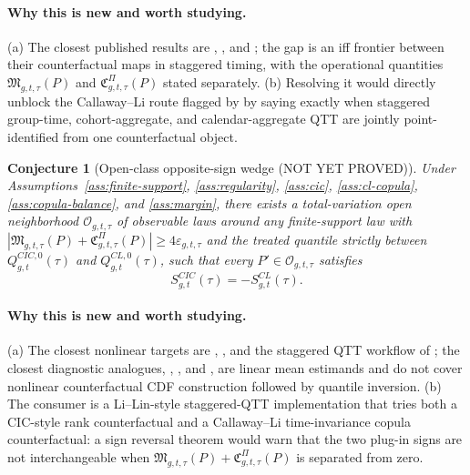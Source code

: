 \documentclass[11pt]{article}
\theoremstyle{definition}
\theoremstyle{plain}
\newtheorem{conjecture}{Conjecture}
\theoremstyle{remark}
\begin{document}
\paragraph{Why this is new and worth studying.}
(a) The closest published results are \citet[Sections 2--3, counterfactual CDF construction]{AtheyImbens2006}, \citet[Sections 2--3, time-invariance copula construction]{CallawayLi2019}, and \citet[abstract and concluding discussion on the staggered copula difficulty]{LiLin2024}; the gap is an iff frontier between their counterfactual maps in staggered timing, with the operational quantities \(\mathfrak M_{g,t,\tau}(P)\) and \(\mathfrak C^{\Pi}_{g,t,\tau}(P)\) stated separately. (b) Resolving it would directly unblock the Callaway--Li route flagged by \citet{LiLin2024} by saying exactly when staggered group-time, cohort-aggregate, and calendar-aggregate QTT are jointly point-identified from one counterfactual object.

\begin{conjecture}[Open-class opposite-sign wedge (NOT YET PROVED)]\label{conj:sign}
Under Assumptions~\ref{ass:finite-support}, \ref{ass:regularity}, \ref{ass:cic}, \ref{ass:cl-copula}, \ref{ass:copula-balance}, and \ref{ass:margin}, there exists a total-variation open neighborhood \(\mathcal O_{g,t,\tau}\) of observable laws around any finite-support law with \(|\mathfrak M_{g,t,\tau}(P)+\mathfrak C^{\Pi}_{g,t,\tau}(P)|\geq 4\varepsilon_{g,t,\tau}\) and the treated quantile strictly between \(Q^{CIC,0}_{g,t}(\tau)\) and \(Q^{CL,0}_{g,t}(\tau)\), such that every \(P'\in\mathcal O_{g,t,\tau}\) satisfies
\[
S^{CIC}_{g,t}(\tau)=-S^{CL}_{g,t}(\tau).
\]
\end{conjecture}
\paragraph{Why this is new and worth studying.}
(a) The closest nonlinear targets are \citet[Sections 2--3]{AtheyImbens2006}, \citet[Sections 2--3]{CallawayLi2019}, and the staggered QTT workflow of \citet[abstract and concluding discussion]{LiLin2024}; the closest diagnostic analogues, \citet{GoodmanBacon2021}, \citet{SunAbraham2021}, and \citet{deChaisemartinDHaultfoeuille2020}, are linear mean estimands and do not cover nonlinear counterfactual CDF construction followed by quantile inversion. (b) The consumer is a Li--Lin-style staggered-QTT implementation that tries both a CIC-style rank counterfactual and a Callaway--Li time-invariance copula counterfactual: a sign reversal theorem would warn that the two plug-in signs are not interchangeable when \(\mathfrak M_{g,t,\tau}(P)+\mathfrak C^{\Pi}_{g,t,\tau}(P)\) is separated from zero.
\end{document}
